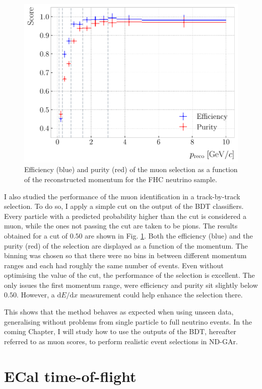 \begin{figure}[t]
	\centering
	\includegraphics[width=.75\linewidth]{Images/GArSoft_PID/BDT/ecal_bdt_validation_momentum.pdf}
	\caption[Efficiency and purity of the muon selection as a function of the reconstructed momentum for the FHC neutrino sample.]{Efficiency (blue) and purity (red) of the muon selection as a function of the reconstructed momentum for the FHC neutrino sample.}
	\label{fig:bdt_validation_output}
\end{figure}

I also studied the performance of the muon identification in a track-by-track selection. To do so, I apply a simple cut on the output of the BDT classifiers. Every particle with a predicted probability higher than the cut is considered a muon, while the ones not passing the cut are taken to be pions. The results obtained for a cut of $0.50$ are shown in Fig. \ref{fig:bdt_validation_output}. Both the efficiency (blue) and the purity (red) of the selection are displayed as a function of the momentum. The binning was chosen so that there were no bins in between different momentum ranges and each had roughly the same number of events. Even without optimising the value of the cut, the performance of the selection is excellent. The only issues the first momentum range, were efficiency and purity sit slightly below $0.50$. However, a $\mathrm{d}E/\mathrm{d}x$ measurement could help enhance the selection there.

This shows that the method behaves as expected when using unseen data, generalising without problems from single particle to full neutrino events. In the coming Chapter, I will study how to use the outputs of the BDT, hereafter referred to as muon scores, to perform realistic event selections in ND-GAr.

\section{ECal time-of-flight}\label{section:tof}

